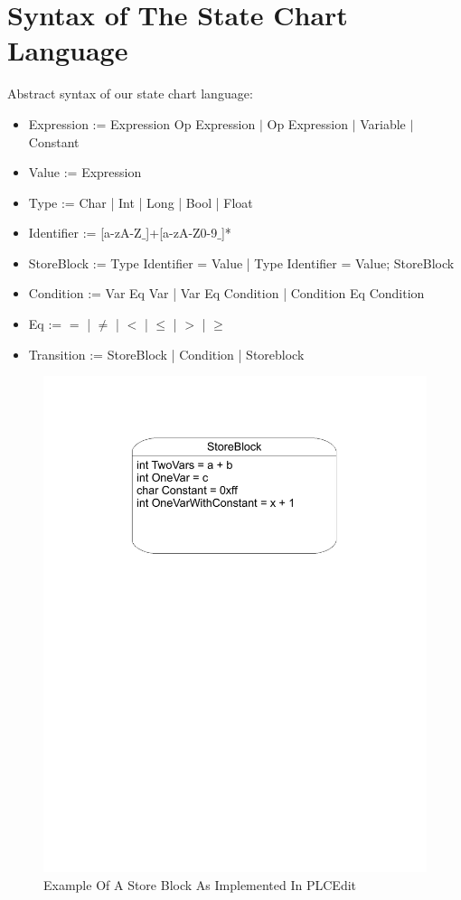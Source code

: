 \section{Syntax of The State Chart Language}

Abstract syntax of our state chart language:

\begin{itemize}
	\item Expression := Expression Op Expression $|$ Op Expression $|$ Variable $|$ Constant
	\item Value := Expression
	\item Type := Char | Int | Long | Bool | Float
	\item Identifier := [a-zA-Z$\_$]+[a-zA-Z0-9$\_$]*  
	
	\item StoreBlock := Type Identifier = Value | Type Identifier = Value; StoreBlock

	\item Condition := Var Eq Var | Var Eq Condition | Condition Eq Condition
	
	\item Eq := $=$ | $\neq$ | $<$ | $\leq$ | $>$ | $\geq$	
	
	\item Transition := StoreBlock | Condition | Storeblock
\end{itemize}

\begin{figure}[htp]
    \centering
    \includegraphics[trim= 20mm 170mm 20mm 10mm, clip, width=\imgmedium]{./images/state_storeblock.pdf}
    \caption{Example Of A Store Block As Implemented In PLCEdit}
    \label{fig:state_storeblock}
\end{figure}

